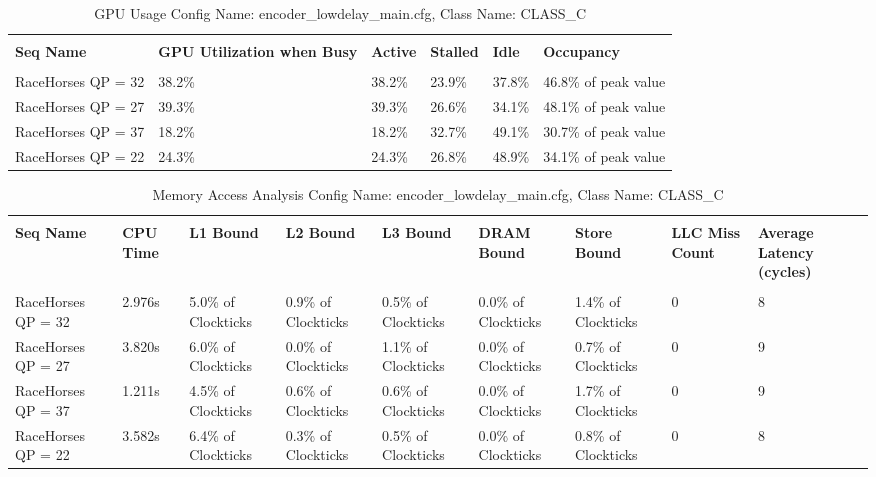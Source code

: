 \documentclass{article}%
\begin{document}
\newpage%
\begin{longtabu}{| X[l] | X[l] | X[l] | X[l] | X[l] | X[l] |}%
\caption{%
GPU Usage\newline%
 Config Name: encoder\_lowdelay\_main.cfg,\newline%
 Class Name: CLASS\_C\newline%
%
}%
\hline%
&&&&&\\%
\textbf{Seq Name}&\textbf{GPU Utilization when Busy}&\textbf{Active}&\textbf{Stalled}&\textbf{Idle}&\textbf{Occupancy}\\%
&&&&&\\%
\hline%
\endhead%
RaceHorses\newline%
 QP = 32&38.2\%&38.2\%&23.9\%&37.8\%&46.8\% of peak value\\%
\hline%
RaceHorses\newline%
 QP = 27&39.3\%&39.3\%&26.6\%&34.1\%&48.1\% of peak value\\%
\hline%
RaceHorses\newline%
 QP = 37&18.2\%&18.2\%&32.7\%&49.1\%&30.7\% of peak value\\%
\hline%
RaceHorses\newline%
 QP = 22&24.3\%&24.3\%&26.8\%&48.9\%&34.1\% of peak value\\%
\hline%
\end{longtabu}%
\begin{longtabu}{| X[l] | X[l] | X[l] | X[l] | X[l] | X[l] | X[l] | X[l] | X[l] |}%
\caption{%
Memory Access Analysis\newline%
 Config Name: encoder\_lowdelay\_main.cfg,\newline%
 Class Name: CLASS\_C\newline%
%
}%
\hline%
&&&&&&&&\\%
\textbf{Seq Name}&\textbf{CPU Time}&\textbf{L1 Bound}&\textbf{L2 Bound}&\textbf{L3 Bound}&\textbf{DRAM Bound}&\textbf{Store Bound}&\textbf{LLC Miss Count}&\textbf{Average Latency (cycles)}\\%
&&&&&&&&\\%
\hline%
\endhead%
RaceHorses\newline%
 QP = 32&2.976s&5.0\% of Clockticks&0.9\% of Clockticks&0.5\% of Clockticks&0.0\% of Clockticks&1.4\% of Clockticks&0&8\\%
\hline%
RaceHorses\newline%
 QP = 27&3.820s&6.0\% of Clockticks&0.0\% of Clockticks&1.1\% of Clockticks&0.0\% of Clockticks&0.7\% of Clockticks&0&9\\%
\hline%
RaceHorses\newline%
 QP = 37&1.211s&4.5\% of Clockticks&0.6\% of Clockticks&0.6\% of Clockticks&0.0\% of Clockticks&1.7\% of Clockticks&0&9\\%
\hline%
RaceHorses\newline%
 QP = 22&3.582s&6.4\% of Clockticks&0.3\% of Clockticks&0.5\% of Clockticks&0.0\% of Clockticks&0.8\% of Clockticks&0&8\\%
\hline%
\end{longtabu}%
\end{document}

